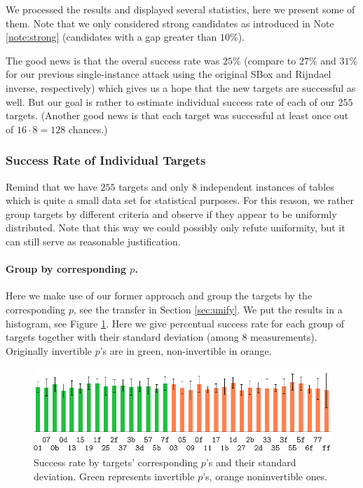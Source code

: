 We processed the results and displayed several statistics, here we present some of them. Note that we only considered strong candidates as introduced in Note \ref{note:strong} (candidates with a gap greater than $10\%$).

The good news is that the overal success rate was $25\%$ (compare to $27\%$ and $31\%$ for our previous single-instance attack using the original SBox and Rijndael inverse, respectively) which gives us a hope that the new targets are successful as well. But our goal is rather to estimate individual success rate of each of our $255$ targets. (Another good news is that each target was successful at least once out of $16\cdot8=128$ chances.)

\subsubsection{Success Rate of Individual Targets}
	
	Remind that we have $255$ targets and only $8$ independent instances of tables which is quite a small data set for statistical purposes. For this reason, we rather group targets by different criteria and observe if they appear to be uniformly distributed. Note that this way we could possibly only refute uniformity, but it can still serve as reasonable justification.
	
	\paragraph{Group by corresponding $p$.}
	
	Here we make use of our former approach and group the targets by the corresponding $p$, see the transfer in Section \ref{sec:unify}. We put the results in a histogram, see Figure \ref{fig:leaktargethist}. Here we give percentual success rate for each group of targets together with their standard deviation (among $8$ measurements). Originally invertible $p$'s are in green, non-invertible in orange.
	
	\begin{figure}[h]
	\begin{center}
		\includegraphics{figures/leak_target/leak_target.pdf}
		\caption{Success rate by targets' corresponding $p$'s and their standard deviation. Green represents invertible $p$'s, orange noninvertible ones.}
		\label{fig:leaktargethist}
	\end{center}
	\end{figure}
	
